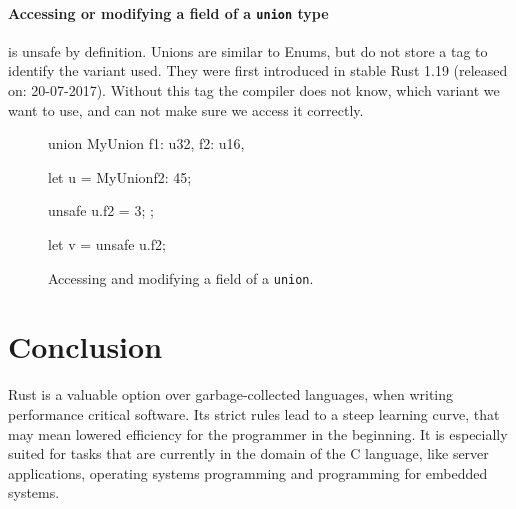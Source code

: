 \documentclass[twocolumn]{article}
\begin{document}
\paragraph{Accessing or modifying a field of a \texttt{union} type} is unsafe by definition.
Unions are similar to Enums, but do not store a tag to identify the variant used.
They were first introduced in stable Rust 1.19 (released on: 20-07-2017)\cite{RustRelease-Union}.
Without this tag the compiler does not know, which variant we want to use, and can not make sure we access it correctly.
\begin{figure}
\begin{rustcode}
union MyUnion {
    f1: u32,
    f2: u16,
}

let u = MyUnion{f2: 45};

unsafe {
    u.f2 = 3;
};

let v = unsafe {u.f2};
\end{rustcode}
\vspace{-2em}
\caption{Accessing and modifying a field of a \texttt{union}.}
\label{unsafe-union}
\end{figure}
\section{Conclusion}
Rust is a valuable option over garbage-collected languages, when writing performance critical software.
Its strict rules lead to a steep learning curve, that may mean lowered efficiency for the programmer in the beginning.
It is especially suited for tasks that are currently in the domain of the C language, like server applications, operating systems programming and programming for embedded systems.


\end{document}
